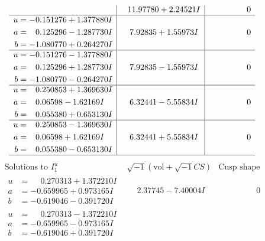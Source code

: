 \documentclass[1p]{elsarticle_modified}
\theoremstyle{definition}
\newcommand{\I}{\sqrt{-1}}
\begin{document}
$$\begin{array}{c|c|c}
 & \phantom{-}11.97780 + 2.24521 I & \phantom{-0.000000 } 0 \\ \hline\begin{aligned}
u &= -0.151276 + 1.377880 I \\
a &= \phantom{-}0.125296 - 1.287730 I \\
b &= -1.080770 + 0.264270 I\end{aligned}
 & \phantom{-}7.92835 + 1.55973 I & \phantom{-0.000000 } 0 \\ \hline\begin{aligned}
u &= -0.151276 - 1.377880 I \\
a &= \phantom{-}0.125296 + 1.287730 I \\
b &= -1.080770 - 0.264270 I\end{aligned}
 & \phantom{-}7.92835 - 1.55973 I & \phantom{-0.000000 } 0 \\ \hline\begin{aligned}
u &= \phantom{-}0.250853 + 1.369630 I \\
a &= \phantom{-}0.06598 - 1.62169 I \\
b &= \phantom{-}0.055380 + 0.653130 I\end{aligned}
 & \phantom{-}6.32441 - 5.55834 I & \phantom{-0.000000 } 0 \\ \hline\begin{aligned}
u &= \phantom{-}0.250853 - 1.369630 I \\
a &= \phantom{-}0.06598 + 1.62169 I \\
b &= \phantom{-}0.055380 - 0.653130 I\end{aligned}
 & \phantom{-}6.32441 + 5.55834 I & \phantom{-0.000000 } 0\\
 \hline 
 \end{array}$$\newpage$$\begin{array}{c|c|c}  
\text{Solutions to }I^u_{1}& \I (\text{vol} + \sqrt{-1}CS) & \text{Cusp shape}\\
 \hline 
\begin{aligned}
u &= \phantom{-}0.270313 + 1.372210 I \\
a &= -0.659965 + 0.973165 I \\
b &= -0.619046 - 0.391720 I\end{aligned}
 & \phantom{-}2.37745 - 7.40004 I & \phantom{-0.000000 } 0 \\ \hline\begin{aligned}
u &= \phantom{-}0.270313 - 1.372210 I \\
a &= -0.659965 - 0.973165 I \\
b &= -0.619046 + 0.391720 I\end{aligned}

\end{array}$$
\end{document}
